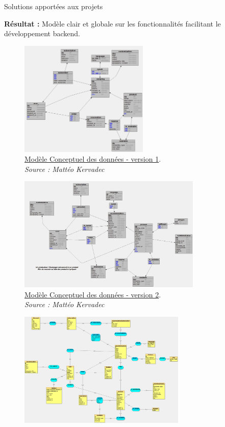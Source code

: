 \documentclass{beamer}
\begin{document}
\begin{frame}[label=realisation]{Solutions apportées aux projets}
\begin{center}
{\begin{minipage}{0.9\textwidth}
				\textbf{Résultat :} Modèle clair et globale sur les fonctionnalités facilitant le développement backend.
			\end{minipage}
		}
		 {
			\begin{figure}[t]
  				\includegraphics[height=5.5cm]{../img/conception/mcd_V1.jpg}
				\caption{	
					\centering			
  					\href{https://github.com/Matteo-K/Soutenance_E-delic/blob/main/img/conception/mcd_V1.jpg}{\underline{Modèle Conceptuel des données - version 1}}.\\
  					\textit{Source : Mattéo Kervadec}
				}
  				\label{fig:mcdV1}
  			\end{figure}
		}
		\only<6> {
			\addtocounter{figure}{1}
			\begin{figure}[t]
  				\includegraphics[height=5.5cm]{../img/conception/mcd_V2.jpg}
				\caption{	
					\centering			
  					\href{https://github.com/Matteo-K/Soutenance_E-delic/blob/main/img/conception/mcd_V2.jpg}{\underline{Modèle Conceptuel des données - version 2}}.\\
  					\textit{Source : Mattéo Kervadec}
				}
  				\label{fig:mcdV2}
  			\end{figure}
		}
		\only<7> {
			\addtocounter{figure}{2}
			\begin{figure}[t]
  				\includegraphics[height=5.5cm]{../img/conception/mcd_V3.jpg}

\end{figure}}
\end{center}
\end{frame}
\end{document}
